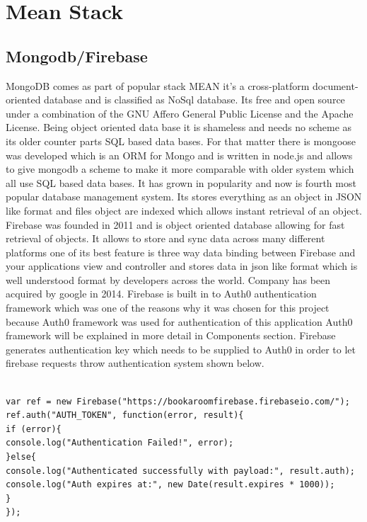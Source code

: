 \section{Mean Stack}
\subsection{Mongodb/Firebase}
\bigbreak
MongoDB comes as part of popular stack MEAN it’s a cross-platform document-oriented database and is classified as NoSql database. Its free and open source under a combination of the GNU Affero General Public License and the Apache License. Being object oriented data base it is shameless and needs no scheme as its older counter parts SQL based data bases. For that matter there is mongoose was developed which is an ORM for Mongo and is written in node.js and allows to give mongodb a scheme to make it more comparable with older system which all use SQL based data bases. It has grown in popularity and now is fourth most popular database management system. Its stores everything as an object in JSON like format and files object are indexed which allows instant retrieval of an object. 
\\
\bigbreak
Firebase was founded in 2011 and is object oriented database allowing for fast retrieval of objects. It allows to store and sync data across many different platforms one of its best feature is three way data binding between Firebase and your applications view and controller and stores data in json like format which is well understood format by developers across the world. Company has been acquired by google in 2014. Firebase is built in to Auth0 authentication framework which was one of the reasons why it was chosen for this project because Auth0 framework was used for authentication of this application Auth0 framework will be explained in more detail in Components section. Firebase generates authentication key which needs to be supplied to Auth0 in order to let firebase requests throw authentication system shown below.
\begin{verbatim}

var ref = new Firebase("https://bookaroomfirebase.firebaseio.com/");
ref.auth("AUTH_TOKEN", function(error, result){
if (error){
console.log("Authentication Failed!", error);
}else{
console.log("Authenticated successfully with payload:", result.auth);
console.log("Auth expires at:", new Date(result.expires * 1000));
}
});

\end{verbatim}



